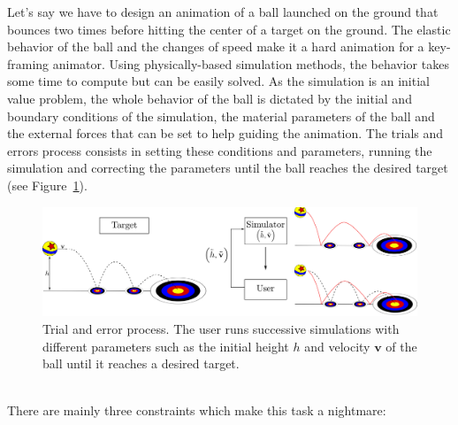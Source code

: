 Let's say we have to design an animation of a ball launched on the ground that bounces two times before hitting the center of a target on the ground. 
The elastic behavior of the ball and the changes of speed make it a hard animation for a key-framing animator. 
Using physically-based simulation methods, the behavior takes some time to compute but can be easily solved.
As the simulation is an initial value problem, the whole behavior of the ball is dictated by the initial and boundary conditions of the simulation, the material parameters of the ball and the external forces that can be set to help guiding the animation. 
The trials and errors process consists in setting these conditions and parameters, running the simulation and correcting the parameters until the ball reaches the desired target (see Figure~\ref{fig:trialErrorProcess}). 
\begin{figure}[!h]
	\centering
	\includegraphics[width=\linewidth]{./images/simulationControl/trialError.png}
	\caption[STAR control: Trial and error process]{\label{fig:trialErrorProcess}Trial and error process. 
	The user runs successive simulations with different parameters such as the initial height $h$ and velocity $\mathbf{v}$ of the ball until it reaches a desired target.}
\end{figure}
\\
There are mainly three constraints which make this task a nightmare:
